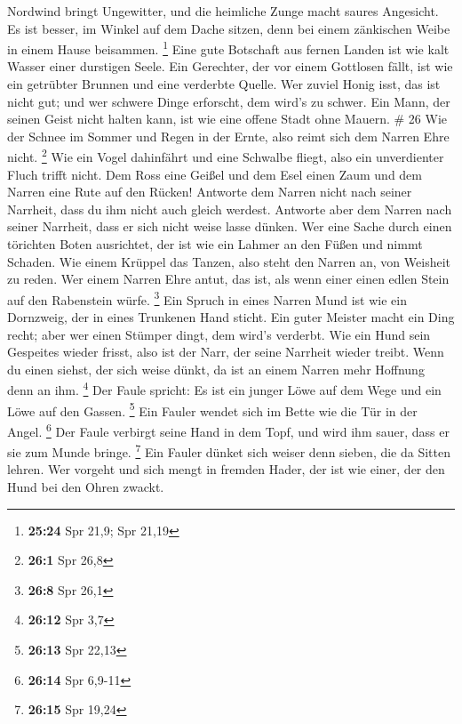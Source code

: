 Nordwind bringt Ungewitter, und die heimliche Zunge macht saures
Angesicht.  Es ist besser, im Winkel auf dem Dache
sitzen, denn bei einem zänkischen Weibe in einem Hause beisammen.
\footnote{\textbf{25:24} Spr 21,9; Spr 21,19}  Eine gute
Botschaft aus fernen Landen ist wie kalt Wasser einer durstigen Seele.
 Ein Gerechter, der vor einem Gottlosen fällt, ist wie
ein getrübter Brunnen und eine verderbte Quelle.  Wer
zuviel Honig isst, das ist nicht gut; und wer schwere Dinge erforscht,
dem wird's zu schwer.  Ein Mann, der seinen Geist nicht
halten kann, ist wie eine offene Stadt ohne Mauern. \# 26 
Wie der Schnee im Sommer und Regen in der Ernte, also reimt sich dem
Narren Ehre nicht. \footnote{\textbf{26:1} Spr 26,8}  Wie
ein Vogel dahinfährt und eine Schwalbe fliegt, also ein unverdienter
Fluch trifft nicht.  Dem Ross eine Geißel und dem Esel
einen Zaum und dem Narren eine Rute auf den Rücken! 
Antworte dem Narren nicht nach seiner Narrheit, dass du ihm nicht auch
gleich werdest.  Antworte aber dem Narren nach seiner
Narrheit, dass er sich nicht weise lasse dünken.  Wer eine
Sache durch einen törichten Boten ausrichtet, der ist wie ein Lahmer an
den Füßen und nimmt Schaden.  Wie einem Krüppel das
Tanzen, also steht den Narren an, von Weisheit zu reden. 
Wer einem Narren Ehre antut, das ist, als wenn einer einen edlen Stein
auf den Rabenstein würfe. \footnote{\textbf{26:8} Spr 26,1}
 Ein Spruch in eines Narren Mund ist wie ein Dornzweig,
der in eines Trunkenen Hand sticht.  Ein guter Meister
macht ein Ding recht; aber wer einen Stümper dingt, dem wird's verderbt.
 Wie ein Hund sein Gespeites wieder frisst, also ist der
Narr, der seine Narrheit wieder treibt.  Wenn du einen
siehst, der sich weise dünkt, da ist an einem Narren mehr Hoffnung denn
an ihm. \footnote{\textbf{26:12} Spr 3,7}  Der Faule
spricht: Es ist ein junger Löwe auf dem Wege und ein Löwe auf den
Gassen. \footnote{\textbf{26:13} Spr 22,13}  Ein Fauler
wendet sich im Bette wie die Tür in der Angel. \footnote{\textbf{26:14}
  Spr 6,9-11}  Der Faule verbirgt seine Hand in dem Topf,
und wird ihm sauer, dass er sie zum Munde bringe. \footnote{\textbf{26:15}
  Spr 19,24}  Ein Fauler dünket sich weiser denn sieben,
die da Sitten lehren.  Wer vorgeht und sich mengt in
fremden Hader, der ist wie einer, der den Hund bei den Ohren zwackt.
